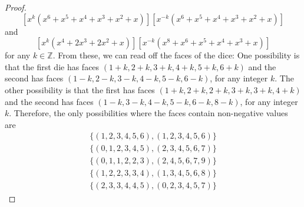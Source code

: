 \documentclass[12pt]{article}
\begin{document}
\begin{enumerate}[leftmargin=0cm,itemindent=.5cm,labelwidth=\itemindent,labelsep=0cm,align=left]
\begin{proof}
$$[x^k(x^6 + x^5 + x^4 + x^3 + x^2 + x)][x^{-k}(x^6 + x^5 + x^4 + x^3 + x^2 + x)]$$
and
$$
[x^k(x^4 + 2x^3 + 2x^2 + x)][x^{-k}(x^8 + x^6 + x^5 + x^4 + x^3 + x)]
$$
for any $k \in \mathbb{Z}$.  From these, we can read off the faces of the dice:
One possibility is that the first die has faces $(1+k,2+k,3+k,4+k,5+k,6+k)$ and the second has faces $(1-k,2-k,3-k,4-k,5-k,6-k)$, for any integer $k$.  The other possibility is that the first has faces $(1+k, 2+k, 2+k, 3+k, 3+k, 4+k)$ and the second has faces $(1-k, 3-k, 4-k, 5-k, 6-k, 8-k)$, for any integer $k$.  Therefore, the only possibilities where the faces contain non-negative values are
\begin{align*}
\{(1,2,3,4,5,6),(1,2,3,4,5,6)\}\\
\{(0,1,2,3,4,5),(2,3,4,5,6,7)\}\\
\{(0,1,1,2,2,3),(2,4,5,6,7,9)\}\\
\{(1,2,2,3,3,4),(1,3,4,5,6,8)\}\\
\{(2,3,3,4,4,5),(0,2,3,4,5,7)\}
\end{align*}
\begin{comment}
To ensure that we have checked all possibilities, we must count the number of combinations that use in 1, 2, or 3 factors.  There are 3 ways to use 1 factor.  To use 2 factors, we may take the square of any one of the three unique factors, or choose 2 different factors, giving 6 total ways.  To use 3 factors, we can take the square of one of the unique factors, then take one copy of either of the two remaining factors (which can be done in $3\cdot2$ ways), or we can take all three unique factors; so this can be done in $7$ ways.  Therefore, there are $3 + 6 + 7 = 16$ total combinations to check.
\begin{center}
\renewcommand{\arraystretch}{1.4}
\begin{tabular}{|c|c|c|}
\hline 
$A(x)$ & Expansion & Sum of Coefficients \\ 
\hline 
$x+1$ & $x+1$ & 2 \\ 
\hline 
$x^2 + x + 1$ & $x^2 + x + 1$ & 3 \\ 
\hline 
$x^2 - x + 1$ & $x^2 + x - 1$ & not all positive \\ 
\hline 
$(x+1)^2$ & $x^2 + 2x + 1$ & 4 \\ 
\hline 
$(x^2 + x + 1)^2$ & $x^4 + 2x^3 + 3x^2 + 2x + 1$ & 9 \\ 
\hline 
$(x^2 - x + 1)^2$ & $x^4 - 2x^3 + 3x^2 - 2x + 1$ & not all positive \\ 
\hline 
$\bold{(x+1)(x^2 + x + 1)}$ & $\bold{x^3 + 2x^2 + 2x + 1}$ & \textbf{6} \\ 

\end{comment}
\end{proof}
\end{enumerate}
\end{document}
